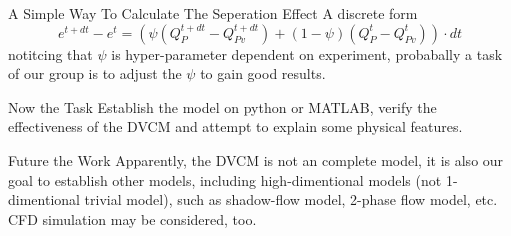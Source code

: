 \documentclass[UTF8]{ctexbeamer}
\begin{document}
\begin{frame}{A Simple Way To Calculate The Seperation Effect}
    A discrete form
    $$ 
    e^{t+dt} -e^{t} =  (\psi (Q_P^{t+dt}-Q_{Pv}^{t+dt}) + (1-\psi) (Q_P^{t}-Q_{Pv}^{t}))\cdot dt
    $$
    notitcing that $\psi$ is hyper-parameter dependent on experiment, probabally a task of our group is to adjust the $\psi$ to gain good results.
\end{frame}

\begin{frame}{Now the Task}
    Establish the model on python or MATLAB, verify the effectiveness of the DVCM and attempt to explain some physical features.
\end{frame}

\begin{frame}{Future the Work}
Apparently, the DVCM is not an complete model, it is also our goal to establish other models, including high-dimentional models (not 1-dimentional trivial model), such as shadow-flow model, 2-phase flow model, etc. CFD simulation may be considered, too.
\end{frame}
\end{document}
